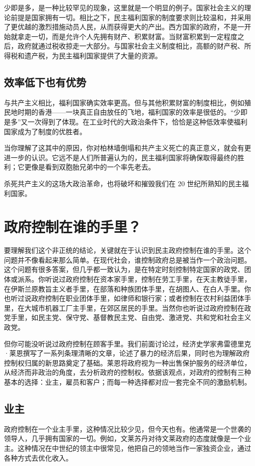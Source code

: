 少即是多，是一种比较罕见的现象，这里就是一个明显的例子。国家社会主义的理论前提是国家拥有一切。相比之下，民主福利国家的制度要求则比较温和，并采用了更优越的激烈措施动员人民，从而获得更大的产出。西方国家的政府，不是一开始就拿走一切，而是允许个人先拥有财产、积累财富。当财富积累到一定程度之后，政府就通过税收掠走一大部分。与国家社会主义制度相比，高额的财产税、所得税和遗产税，为民主福利国家提供了大量的资源。

\subsection{效率低下也有优势}
与共产主义相比，福利国家确实效率更高。但与其他积累财富的制度相比，例如殖民地时期的香港——一块真正自由放任的飞地，福利国家的效率是很低的。“少即是多”又一次得到了体现。在工业时代的大政治条件下，恰恰是这种低效率使福利国家成为了制度的优胜者。

当你理解了这其中的原因，你对柏林墙倒塌和共产主义死亡的真正意义，就会有更进一步的认识。它远不是人们所普遍认为的，民主福利国家将确保取得最终的胜利；它更像是看到双胞胎兄弟中的一个率先老去。

杀死共产主义的这场大政治革命，也将破坏和摧毁我们在 20 世纪所熟知的民主福利国家。

\section{政府控制在谁的手里？}
要理解我们这个非正统的结论，关键就在于认识到民主政府控制在谁的手里。这个问题并不像看起来那么简单。在现代社会，谁控制政府总是被当作一个政治问题。这个问题有很多答案，但几乎都一致认为，是在特定时刻控制特定国家的政党、团体或派系。你听说过政府控制在资本家手里，控制在劳工手里，在天主教徒手里，在伊斯兰原教旨主义者手里，在部落和种族团体手里，在胡图人、在白人手里。你也听过说政府控制在职业团体手里，如律师和银行家；或者控制在农村利益团体手里，在大城市机器工厂主手里，在郊区居民的手里。当然你也听说过政府控制在政党手里，如民主党、保守党、基督教民主党、自由党、激进党、共和党和社会主义政党。

但你可能没听说过政府控制在顾客手里。我们前面讨论过，经济史学家弗雷德里克·莱恩撰写了一系列条理清晰的文章，论述了暴力的经济后果，同时也为理解政府控制权归属的新思路奠定了基础。莱恩将政府视为一种出售保护服务的经济单位，从经济而非政治的角度，去分析政府的控制权。依据该观点，对政府的控制有三种基本的选择：业主，雇员和客户；而每一种选择都对应一套完全不同的激励机制。

\subsection{业主}
政府控制在一个业主手里，这种情况比较少见，但今天也有。他通常是一个世袭的领导人，几乎拥有国家的一切。例如，文莱苏丹对待文莱政府的态度就像是一个业主。这种情况在中世纪的领主中很常见，他把自己的领地当作一家独资企业，通过各种方式去优化收入。

